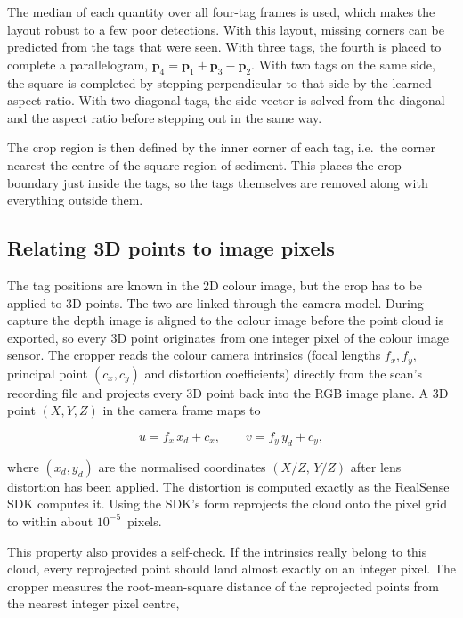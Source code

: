 The median of each quantity over all four-tag frames is used, which makes the layout robust to a few poor detections. With this layout, missing corners can be predicted from the tags that were seen. With three tags, the fourth is placed to complete a parallelogram, $\mathbf{p}_4 = \mathbf{p}_1 + \mathbf{p}_3 - \mathbf{p}_2$. With two tags on the same side, the square is completed by stepping perpendicular to that side by the learned aspect ratio. With two diagonal tags, the side vector is solved from the diagonal and the aspect ratio before stepping out in the same way.

The crop region is then defined by the inner corner of each tag, i.e.\ the corner nearest the centre of the square region of sediment. This places the crop boundary just inside the tags, so the tags themselves are removed along
with everything outside them.

\subsection{Relating 3D points to image pixels}

The tag positions are known in the 2D colour image, but the crop has to be applied to 3D points. The two are linked through the camera model. During capture the depth image is aligned to the colour image before the point cloud is exported, so every 3D point originates from one integer pixel of the colour image sensor. The cropper reads the colour camera intrinsics (focal lengths $f_x, f_y$, principal point $(c_x, c_y)$ and distortion coefficients) directly from the scan's recording file and projects every 3D point back into the RGB image plane. A 3D point $(X, Y, Z)$ in the camera frame maps to

\begin{equation}
	u = f_x\, x_d + c_x, \qquad v = f_y\, y_d + c_y,
	\label{eq:projection}
\end{equation}

where $(x_d, y_d)$ are the normalised coordinates $(X/Z,\, Y/Z)$ after lens distortion has been applied. The distortion is computed exactly as the RealSense SDK computes it. Using the SDK's form reprojects the cloud onto the pixel grid to within about $10^{-5}$~pixels.

This property also provides a self-check. If the intrinsics really belong to this cloud, every reprojected point should land almost exactly on an integer pixel. The cropper measures the root-mean-square distance of the reprojected points from the nearest integer pixel centre,

